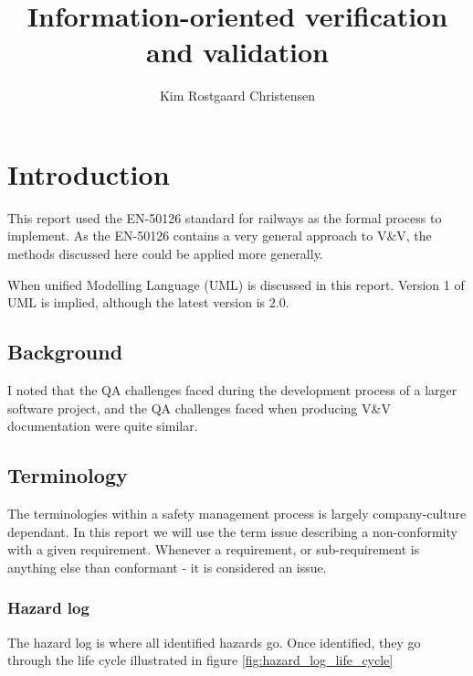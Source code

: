 \documentclass[10pt,a4paper]{article}
\author{Kim Rostgaard Christensen}
\title{Information-oriented verification and validation}
\begin{document}
\maketitle


\tableofcontents
\newpage

\section{Introduction}
This report used the EN-50126 standard for railways as the formal process to implement. As the EN-50126 contains a very general approach to V\&V, the methods discussed here could be applied more generally.

When unified Modelling Language (UML) is discussed in this report. Version 1 of UML is implied, although the latest version is 2.0.
\subsection{Background}
I noted that the QA challenges faced during the development process of a larger software project, and the QA challenges faced when producing V\&V documentation were quite similar.


\subsection{Terminology}
The terminologies within a safety management process is largely company-culture dependant. In this report we will use the term issue describing a non-conformity with a given requirement. Whenever a requirement, or sub-requirement is anything else than conformant - it is considered an issue.

\subsubsection{Hazard log}
The hazard log is where all identified hazards go. Once identified, they go through the life cycle illustrated in figure \ref{fig:hazard_log_life_cycle}
\end{document}
